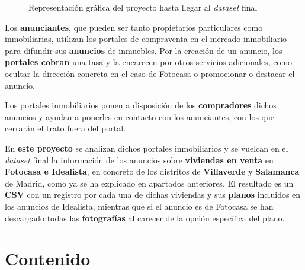 \documentclass[12pt]{article}
\begin{document}
\begin{figure}[h]
	\centering
	\caption{Representación gráfica del proyecto hasta llegar al \textit{dataset} final}
\end{figure}

Los \textbf{anunciantes}, que pueden ser tanto propietarios particulares como inmobiliarias, utilizan los portales de compraventa en el mercado inmobiliario para difundir sus \textbf{anuncios} de inmuebles. Por la creación de un anuncio, los \textbf{portales cobran} una tasa y la encarecen por otros servicios adicionales, como ocultar la dirección concreta en el caso de Fotocasa o promocionar o destacar el anuncio.

Los portales inmobiliarios ponen a disposición de los \textbf{compradores} dichos anuncios y ayudan a ponerles en contacto con los anunciantes, con los que cerrarán el trato fuera del portal.

En \textbf{este proyecto} se analizan dichos portales inmobiliarios y se vuelcan en el \textit{dataset} final la información de los anuncios sobre \textbf{viviendas en venta} en F\textbf{otocasa e Idealista}, en concreto de los distritos de \textbf{Villaverde} y \textbf{Salamanca} de Madrid, como ya se ha explicado en apartados anteriores. El resultado es un \textbf{CSV} con un registro por cada una de dichas viviendas y sus \textbf{planos} incluidos en los anuncios de Idealista, mientras que si el anuncio es de Fotocasa se han descargado todas las \textbf{fotografías} al carecer de la opción específica del plano. 

\newpage

\vspace{-1.5em}\section{Contenido}\vspace{-1.0em}
\end{document}
